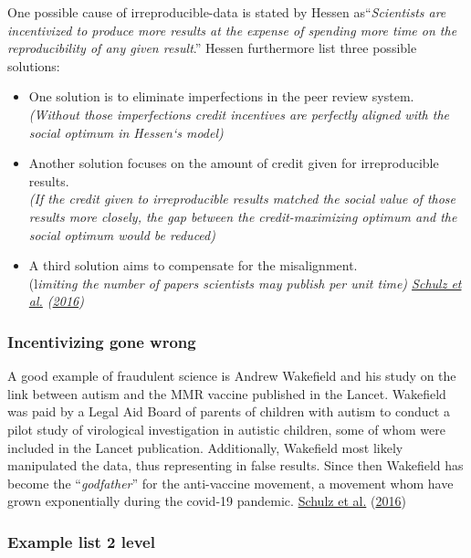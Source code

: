 \documentclass[
  12pt,
]{article}
\begin{document}
One possible cause of irreproducible-data is stated by Hessen
as``\emph{Scientists are incentivized to produce more results at the
expense of spending more time on the reproducibility of any given
result}.'' Hessen furthermore list three possible solutions:

\begin{itemize}
\item
  One solution is to eliminate imperfections in the peer review
  system.\\
  \emph{(Without those imperfections credit incentives are perfectly
  aligned with the social optimum in Hessen`s model)}
\item
  Another solution focuses on the amount of credit given for
  irreproducible results.\\
  \emph{(If the credit given to irreproducible results matched the
  social value of those results more closely, the gap between the
  credit-maximizing optimum and the social optimum would be reduced)}
\item
  A third solution aims to compensate for the misalignment.\\
  (l\emph{imiting the number of papers scientists may publish per unit
  time) \protect\hyperlink{ref-schulz2016}{Schulz et al.}
  (\protect\hyperlink{ref-schulz2016}{2016})}
\end{itemize}

\hypertarget{incentivizing-gone-wrong}{%
\subsubsection{Incentivizing gone
wrong}\label{incentivizing-gone-wrong}}

A good example of fraudulent science is Andrew Wakefield and his study
on the link between autism and the MMR vaccine published in the Lancet.
Wakefield was paid by a Legal Aid Board of parents of children with
autism to conduct a pilot study of virological investigation in autistic
children, some of whom were included in the Lancet publication.
Additionally, Wakefield most likely manipulated the data, thus
representing in false results. Since then Wakefield has become the
``\emph{godfather}'' for the anti-vaccine movement, a movement whom have
grown exponentially during the covid-19 pandemic.
\protect\hyperlink{ref-schulz2016}{Schulz et al.}
(\protect\hyperlink{ref-schulz2016}{2016})

\hypertarget{example-list-2-level}{%
\subsubsection{Example list 2 level}\label{example-list-2-level}}
\end{document}
